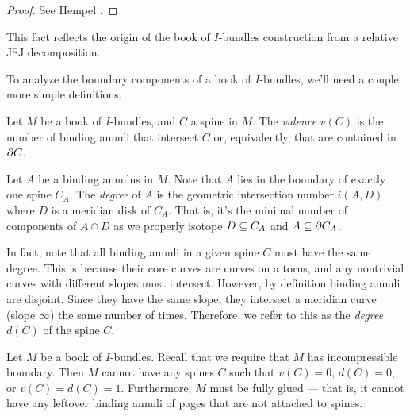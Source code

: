 \begin{proof}

See Hempel \cite[Theorem 10.5]{He}.

\end{proof}

This fact reflects the origin of the book of $I$-bundles construction from
a relative JSJ decomposition.

To analyze the boundary components of a book of $I$-bundles, we'll need
a couple more simple definitions.

\begin{defn}

Let $M$ be a book of $I$-bundles, and $C$ a spine in $M$.  The \emph{valence}
$v(C)$ is the number of binding annuli that intersect $C$ or, equivalently,
that are contained in $\partial C$.

Let $A$ be a binding annulus in $M$. Note that $A$ lies in the boundary of
exactly one spine $C_A$. The \emph{degree} of $A$ is the geometric intersection
number $i(A,D)$, where $D$ is a meridian disk of $C_A$. That is, it's the
minimal number of components of $A \cap D$ as we properly isotope $D \subseteq C_A$
and $A \subseteq \partial C_A$.

In fact, note that all binding annuli in a given spine $C$ must have the same
degree. This is because their core curves are curves on a torus, and any
nontrivial curves with different slopes must intersect. However, by definition
binding annuli are disjoint. Since they have the same slope, they intersect
a meridian curve (slope $\infty$) the same number of times.  Therefore, we
refer to this as the \emph{degree} $d(C)$ of the spine $C$.

\end{defn}

\begin{prop}\label{P:1ptcap}

Let $M$ be a book of $I$-bundles. Recall that we require that $M$ has
incompressible boundary. Then $M$ cannot have any spines $C$ such that
$v(C)=0$, $d(C)=0$, or $v(C)=d(C)=1$. Furthermore, $M$ must be fully glued ---
that is, it cannot have any leftover binding annuli of pages that are not
attached to spines.

\end{prop}

